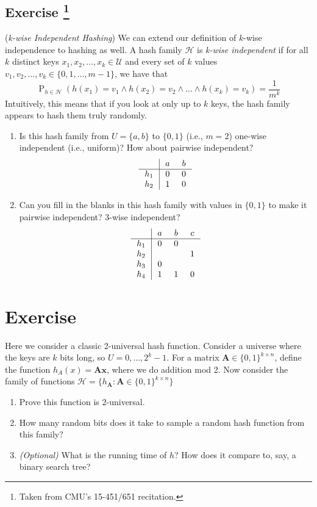 \documentclass[14pt]{extreport}
\newcounter{counter}
\newcommand{\Exercise}{Exercise \stepcounter{counter}\thecounter}
\renewcommand{\Pr}[2][]{\operatorname{P}_{#1}\left(#2\right)}
\begin{document}
\subsection*{\Exercise\footnote{Taken from CMU's 15-451/651 recitation.}}
    (\textit{k-wise Independent Hashing}) We can extend our definition of $k$-wise independence to hashing as well. A hash family $\mathcal{H}$ is \textit{k-wise independent} if for all $k$ distinct keys $x_1, x_2, \ldots, x_k \in \mathcal{U}$ and every set of $k$ values $v_1, v_2, \ldots, v_k \in \{0, 1, \ldots, m-1\}$, we have that $$ \Pr[h \in \mathcal{H}]{h(x_1) = v_1 \land h(x_2) = v_2 \land \ldots \land h(x_k) = v_k} = \frac{1}{m^k}$$
    Intuitively, this means that if you look at only up to $k$ keys, the hash family appears to hash them truly randomly.
    \begin{enumerate}
        \item Is this hash family from $U = \{a, b\}$ to $\{0, 1\}$ (i.e., $m = 2$) one-wise independent (i.e., uniform)? How about pairwise independent?
        $$ \arraycolsep=7pt
        \begin{array}{c|cc}
            & a & b \\
            \hline
            h_1 & 0 & 0 \\
            h_2 & 1 & 0 \\
        \end{array} $$
        
        \item Can you fill in the blanks in this hash family with values in $\{0, 1\}$ to make it pairwise independent? 3-wise independent?
        $$ \arraycolsep=7pt
        \begin{array}{c|ccc}
            & a & b & c \\
            \hline
            h_1 & 0 & 0 &  \\
            h_2 &  &  & 1 \\
            h_3 & 0 &  &  \\
            h_4 & 1 & 1 & 0 \\
        \end{array}  $$
    \end{enumerate}

\section*{\Exercise}
    Here we consider a classic 2-universal hash function. Consider a universe where the keys are $k$ bits long, so $U = 0, \dots, 2^{k} - 1$. For a matrix $ \bm{A} \in \{0, 1\}^{k \times n} $, define the function $ h_{A}(x) = \bm{A}\bm{x} $, where we do addition mod 2. Now consider the family of functions $ \mathcal{H} = \{h_{\bm{A}} : \bm{A} \in \{0, 1\}^{k \times n} \} $
    \begin{enumerate}
        \item Prove this function is 2-universal.
        \item How many random bits does it take to sample a random hash function from this family?
        \item \textit{(Optional)} What is the running time of $h$? How does it compare to, say, a binary search tree?
    \end{enumerate}
\end{document}
